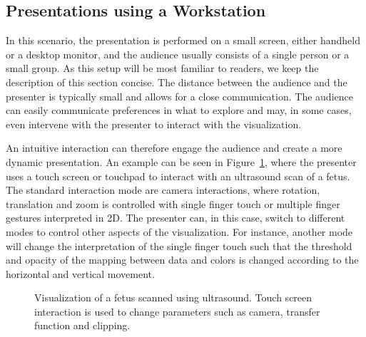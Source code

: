\documentclass[journal]{vgtc}                %
\begin{document}
%
%
\subsection{Presentations using a Workstation} \label{sec:workstation}
In this scenario, the presentation is performed on a small screen, either handheld or a desktop monitor, and the audience usually consists of a single person or a small group.
As this setup will be most familiar to readers, we keep the description of this section concise.
The distance between the audience and the presenter is typically small and allows for a close communication.
The audience can easily communicate preferences in what to explore and may, in some cases, even intervene with the presenter to interact with the visualization.

An intuitive interaction can therefore engage the audience and create a more dynamic presentation.
An example can be seen in Figure~\ref{img:touch_workstation}, where the presenter uses a touch screen or touchpad to interact with an ultrasound scan of a fetus.
The standard interaction mode are camera interactions, where rotation, translation and zoom is controlled with single finger touch or multiple finger gestures interpreted in 2D.
The presenter can, in this case, switch to different modes to control other aspects of the visualization. For instance, another mode will change the interpretation of the single finger touch such that the threshold and opacity of the mapping between data and colors is changed according to the horizontal and vertical movement.

%
%
%
%

\begin{figure}
	\centering
	\caption{Visualization of a fetus scanned using ultrasound. Touch screen interaction is used to change parameters such as camera, transfer function and clipping.}
	\label{img:touch_workstation}
\end{figure}
\end{document}
